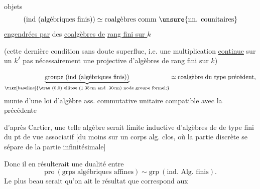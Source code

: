 
  objets
\[
\text{(ind (algébriques finis))}\simeq\text{coalgèbres comm \unsure{nn. counitaires}}
\]
 \uline{engendrées par} des \uline{coalgèbres de} \uline{rang fini sur $k$}

\deleted{[une telle coalgèbre est en effet engendrée par des coalgèbres}
(cette dernière condition sans doute superflue, i.e. une multiplication  \uline{continue} sur un $k^I$   pas nécessairement une   projective d'algèbres de rang fini sur $k$)


\[
\underbrace{\text{groupe (ind (algébriques finis))}}_{\text{\tikz[baseline]{\draw (0,0) ellipse (1.35cm and .30cm) node {groupe formel};}}}
\simeq\text{coalgèbre du type précédent,}
\]
munie d'une loi d'algèbre ass. commutative unitaire compatible avec la précédente


d'après Cartier,  une telle algèbre serait limite inductive d'algèbres de  de type fini du pt de vue associatif [du moins sur un corps alg. clos, où la partie discrète se sépare de la partie infinitésimale]

Donc il en résulterait une dualité entre
\[
\mathrm{pro}\ (\text{grps algébriques affines})\sim\mathrm{grp}\ (\text{ind. Alg. finis}).
\]
Le plus beau serait  qu'on ait le résultat que  correspond aux  \uline{}
